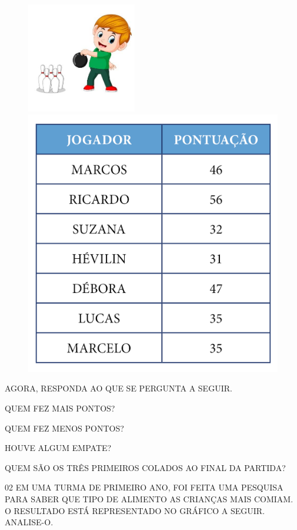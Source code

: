 \begin{figure}[htpb!]
\centering
\includegraphics[width=1.88542in,height=1.88542in]{media/image95.jpg}
\includegraphics[width=.5\textwidth]{../ilustracoes/MAT1/SAEB_1ANO_MAT_FIGURA96.png}
\end{figure}

AGORA, RESPONDA AO QUE SE PERGUNTA A SEGUIR.

\begin{escolha}
\item QUEM FEZ MAIS PONTOS?


\item QUEM FEZ MENOS PONTOS?


\item HOUVE ALGUM EMPATE?


\item QUEM SÃO OS TRÊS PRIMEIROS COLADOS AO FINAL DA PARTIDA?

\end{escolha}

\pagebreak
\num{02} EM UMA TURMA DE PRIMEIRO ANO, FOI FEITA UMA PESQUISA PARA SABER QUE TIPO DE ALIMENTO AS
CRIANÇAS MAIS COMIAM. O RESULTADO ESTÁ REPRESENTADO NO GRÁFICO A SEGUIR. ANALISE-O.


